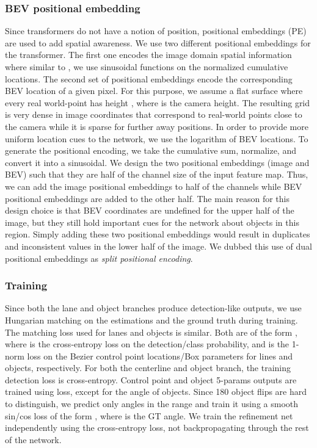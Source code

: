 \documentclass[10pt,twocolumn,letterpaper]{article}
\begin{document}
\subsubsection{BEV positional embedding}
Since transformers do not have a notion of position, positional embeddings (PE) are used to add spatial awareness. We use two different positional embeddings for the transformer. The first one encodes the image domain spatial information where similar to \cite{DBLP:conf/eccv/CarionMSUKZ20}, we use sinusoidal functions on the normalized cumulative locations. The second set of positional embeddings encode the corresponding BEV location of a given pixel. For this purpose, we assume a flat surface where every real world-point has height , where  is the camera height. The resulting grid is very dense in image coordinates that correspond to real-world points close to the camera while it is sparse for further away positions. In order to provide more uniform location cues to the network, we use the logarithm of BEV locations. To generate the positional encoding, we take the cumulative sum, normalize, and convert it into a sinusoidal. We design the two positional embeddings (image and BEV) such that they are half of the channel size of the input feature map. Thus, we can add the image positional embeddings to half of the channels while BEV positional embeddings are added to the other half. The main reason for this design choice is that BEV coordinates are undefined for the upper half of the image, but they still hold important cues for the network about objects in this region. Simply adding these two positional embeddings would result in duplicates and inconsistent values in the lower half of the image. We dubbed this use of dual positional embeddings as \emph{split positional encoding}.    


\subsubsection{Training}
Since both the lane and object branches produce detection-like outputs, we use Hungarian matching on the estimations and the ground truth during training. The matching loss used for lanes and objects is similar. Both are of the form , where  is the cross-entropy loss on the detection/class probability, and  is the 1-norm loss on the Bezier control point locations/Box parameters for lines and objects, respectively. For both the centerline and object branch, the training detection loss is cross-entropy.
Control point and object 5-params outputs are trained using  loss, except for the angle of objects. Since 180 object flips are hard to distinguish, we predict only angles in the range  and train it using a smooth sin/cos  loss of the form , where  is the GT angle. We train the refinement net independently using the cross-entropy loss, not backpropagating through the rest of the network. 
\end{document}

